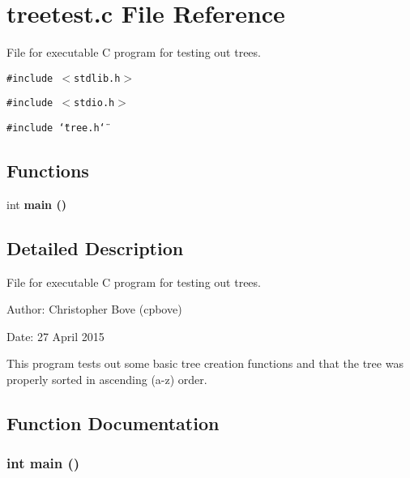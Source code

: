 \section{treetest.c File Reference}
\label{treetest_8c}
File for executable C program for testing out trees. 

{\tt \#include $<$stdlib.h$>$}\par
{\tt \#include $<$stdio.h$>$}\par
{\tt \#include \char`\"{}tree.h\char`\"{}}\par
\subsection*{Functions}
\begin{CompactItemize}
\item 
int \bf{main} ()
\end{CompactItemize}


\subsection{Detailed Description}
File for executable C program for testing out trees. 

\begin{Desc}
\item[Author:]Christopher Bove (cpbove) \end{Desc}
\begin{Desc}
\item[Date:]27 April 2015\end{Desc}
This program tests out some basic tree creation functions and that the tree was properly sorted in ascending (a-z) order. 

\subsection{Function Documentation}
\subsubsection{\setlength{\rightskip}{0pt plus 5cm}int main ()}\label{treetest_8c_e66f6b31b5ad750f1fe042a706a4e3d4}


